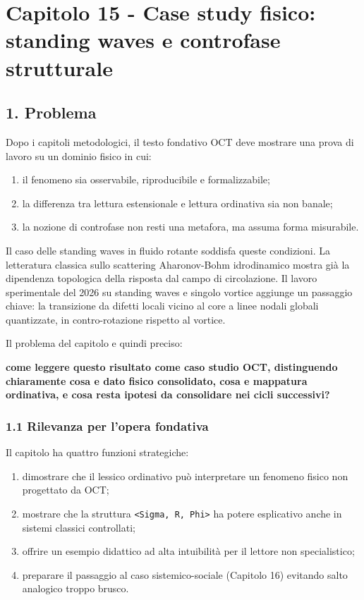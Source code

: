 \chapter{Capitolo 15 - Case study fisico: standing waves e controfase strutturale}

\section{1. Problema}

Dopo i capitoli metodologici, il testo fondativo OCT deve mostrare una prova di lavoro su un dominio fisico in cui:

\begin{enumerate}
\def\labelenumi{\arabic{enumi}.}
\tightlist
\item
  il fenomeno sia osservabile, riproducibile e formalizzabile;
\item
  la differenza tra lettura estensionale e lettura ordinativa sia non banale;
\item
  la nozione di controfase non resti una metafora, ma assuma forma misurabile.
\end{enumerate}

Il caso delle standing waves in fluido rotante soddisfa queste condizioni. La letteratura classica sullo scattering Aharonov-Bohm idrodinamico mostra già la dipendenza topologica della risposta dal campo di circolazione. Il lavoro sperimentale del 2026 su standing waves e singolo vortice aggiunge un passaggio chiave: la transizione da difetti locali vicino al core a linee nodali globali quantizzate, in contro-rotazione rispetto al vortice.

Il problema del capitolo e quindi preciso:

\textbf{come leggere questo risultato come caso studio OCT, distinguendo chiaramente cosa e dato fisico consolidato, cosa e mappatura ordinativa, e cosa resta ipotesi da consolidare nei cicli successivi?}

\subsection{1.1 Rilevanza per l'opera fondativa}

Il capitolo ha quattro funzioni strategiche:

\begin{enumerate}
\def\labelenumi{\arabic{enumi}.}
\tightlist
\item
  dimostrare che il lessico ordinativo può interpretare un fenomeno fisico non progettato da OCT;
\item
  mostrare che la struttura \texttt{\textless{}Sigma,\ R,\ Phi\textgreater{}} ha potere esplicativo anche in sistemi classici controllati;
\item
  offrire un esempio didattico ad alta intuibilità per il lettore non specialistico;
\item
  preparare il passaggio al caso sistemico-sociale (Capitolo 16) evitando salto analogico troppo brusco.
\end{enumerate}

